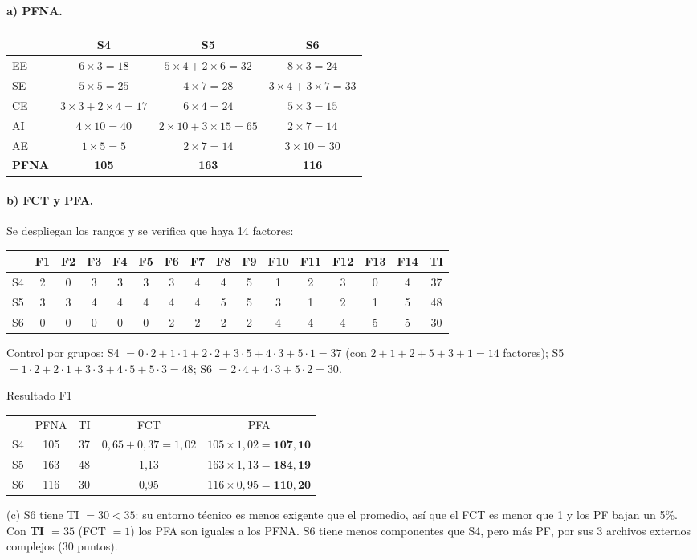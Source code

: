 \documentclass[11pt,a4paper]{article}
\begin{document}
\paragraph{a) PFNA.}
\begin{center}\small
\begin{tabular}{lccc}
\toprule
 & S4 & S5 & S6\\
\midrule
EE & $6 \times 3 = 18$ & $5 \times 4 + 2 \times 6 = 32$ & $8 \times 3 = 24$\\
SE & $5 \times 5 = 25$ & $4 \times 7 = 28$ & $3 \times 4 + 3 \times 7 = 33$\\
CE & $3 \times 3 + 2 \times 4 = 17$ & $6 \times 4 = 24$ & $5 \times 3 = 15$\\
AI & $4 \times 10 = 40$ & $2 \times 10 + 3 \times 15 = 65$ & $2 \times 7 = 14$\\
AE & $1 \times 5 = 5$ & $2 \times 7 = 14$ & $3 \times 10 = 30$\\
\midrule
\textbf{PFNA} & \textbf{105} & \textbf{163} & \textbf{116}\\
\bottomrule
\end{tabular}
\end{center}
\paragraph{b) FCT y PFA.} Se despliegan los rangos y se verifica que haya 14 factores:
\begin{center}\small
\begin{tabular}{l*{14}{c}c}
\toprule
 & F1 & F2 & F3 & F4 & F5 & F6 & F7 & F8 & F9 & F10 & F11 & F12 & F13 & F14 & TI\\
\midrule
S4 & 2 & 0 & 3 & 3 & 3 & 3 & 4 & 4 & 5 & 1 & 2 & 3 & 0 & 4 & 37\\
S5 & 3 & 3 & 4 & 4 & 4 & 4 & 4 & 5 & 5 & 3 & 1 & 2 & 1 & 5 & 48\\
S6 & 0 & 0 & 0 & 0 & 0 & 2 & 2 & 2 & 2 & 4 & 4 & 4 & 5 & 5 & 30\\
\bottomrule
\end{tabular}
\end{center}
Control por grupos: S4 $= 0 \cdot 2 + 1 \cdot 1 + 2 \cdot 2 + 3 \cdot 5 + 4 \cdot 3 + 5 \cdot 1 = 37$ (con $2 + 1 + 2 + 5 +
3 + 1 = 14$ factores); S5 $= 1 \cdot 2 + 2 \cdot 1 + 3 \cdot 3 + 4 \cdot 5 + 5 \cdot 3 = 48$; S6 $= 2 \cdot 4 + 4 \cdot 3 + 5
\cdot 2 = 30$.
\begin{resultado}{Resultado F1}
\begin{tabular}{lcccc}
 & PFNA & TI & FCT & PFA\\
S4 & 105 & 37 & $0{,}65 + 0{,}37 = 1{,}02$ & $105 \times 1{,}02 = \mathbf{107{,}10}$\\
S5 & 163 & 48 & 1,13 & $163 \times 1{,}13 = \mathbf{184{,}19}$\\
S6 & 116 & 30 & 0,95 & $116 \times 0{,}95 = \mathbf{110{,}20}$\\
\end{tabular}
\end{resultado}
(c) S6 tiene TI $= 30 < 35$: su entorno técnico es menos exigente que el promedio, así que el FCT es menor que 1 y
los PF bajan un 5\%. Con \textbf{TI $= 35$} (FCT $= 1$) los PFA son iguales a los PFNA. S6 tiene menos componentes
que S4, pero más PF, por sus 3 archivos externos complejos (30 puntos).
\end{document}
